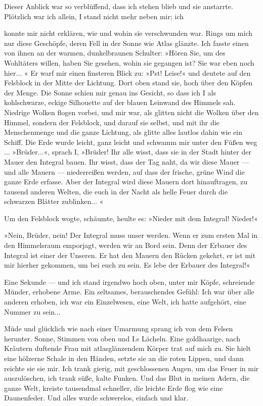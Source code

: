Dieser Anblick war so verblüffend, dass ich stehen blieb und sie
anstarrte. Plötzlich war ich allein, I stand nicht mehr neben mir;
ich

konnte mir nicht erklären, wie und wohin sie verschwunden war.
Rings um mich nur diese Geschöpfe, deren Fell in der Sonne wie
Atlas glänzte. Ich fasste einen von ihnen an der warmen,
dunkelbraunen Schulter: »Hören Sie, um des Wohltäters willen, haben
Sie gesehen, wohin sie gegangen ist? Sie war eben noch hier... « Er
warf mir einen finsteren Blick zu: »Pst! Leise!« und deutete auf
den Felsblock in der Mitte der Lichtung. Dort oben stand sie, hoch
über den Köpfen der Menge. Die Sonne schien mir genau ins Gesicht,
so dass ich I als kohlschwarze, eckige Silhouette auf der blauen
Leinwand des Himmels sah. Niedrige Wolken flogen vorbei, und mir
war, als glitten nicht die Wolken über den Himmel, sondern der
Felsblock, und darauf sie selbst, und mit ihr die Menschenmenge und
die ganze Lichtung, als glitte alles lautlos dahin wie ein Schiff.
Die Erde wurde leicht, ganz leicht und schwamm mir unter den Füßen
weg ... »Brüder...«, sprach I, »Brüder! Ihr alle wisst, dass sie in
der Stadt hinter der Mauer den Integral bauen. Ihr wisst, dass der
Tag naht, da wir diese Mauer — und alle Mauern — niederreißen
werden, auf dass der frische, grüne Wind die ganze Erde erfasse.
Aber der Integral wird diese Mauern dort hinauftragen, zu tausend
anderen Welten, die euch in der Nacht als helle Feuer durch die
schwarzen Blätter zublinken... «

Um den Felsblock wogte, schäumte, heulte es: »Nieder mit dem
Integral! Nieder!«

»Nein, Brüder, nein! Der Integral muss unser werden. Wenn er zum
ersten Mal in den Himmelsraum emporjagt, werden wir an Bord sein.
Denn der Erbauer des Integral ist einer der Unseren. Er hat den
Mauern den Rücken gekehrt, er ist mit mir hierher gekommen, um bei
euch zu sein. Es lebe der Erbauer des Integral!«

Eine Sekunde — und ich stand irgendwo hoch oben, unter mir Köpfe,
schreiende Münder, erhobene Arme. Ein seltsames, berauschendes
Gefühl: Ich war über alle anderen erhoben, ich war ein Einzelwesen,
eine Welt, ich hatte aufgehört, eine Nummer zu sein...

Müde und glücklich wie nach einer Umarmung sprang ich von dem
Felsen herunter. Sonne, Stimmen von oben und I.s Lächeln. Eine
goldhaarige, nach Kräutern duftende Frau mit atlasglänzendem Körper
trat auf mich zu. Sie hielt eine hölzerne Schale in den Händen,
setzte sie an die roten Lippen, und dann reichte sie sie mir. Ich
trank gierig, mit geschlossenen Augen, um das Feuer in mir
auszulöschen, ich trank süße, kalte Funken. Und das Blut in meinen
Adern, die ganze Welt, kreiste tausendmal schneller, die leichte
Erde flog wie eine Daunenfeder. Und alles wurde schwerelos, einfach
und klar.

